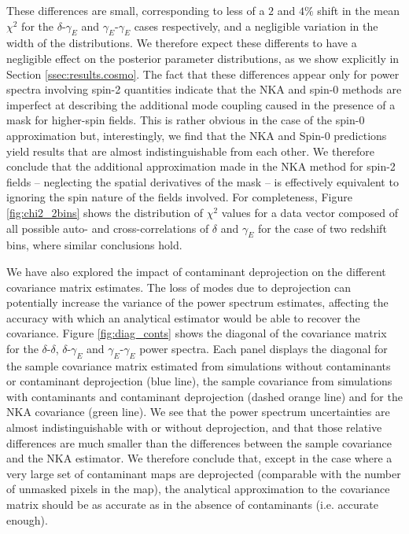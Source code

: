 \documentclass[a4paper,11pt]{article}
\begin{document}
      These differences are small, corresponding to less of a $2$ and $4\%$ shift in the mean $\chi^2$ for the $\delta$-$\gamma_E$ and $\gamma_E$-$\gamma_E$ cases respectively, and a negligible variation in the width of the distributions. We therefore expect these differents to have a negligible effect on the posterior parameter distributions, as we show explicitly in Section \ref{ssec:results.cosmo}. The fact that these differences appear only for power spectra involving spin-2 quantities indicate that the NKA and spin-0 methods are imperfect at describing the additional mode coupling caused in the presence of a mask for higher-spin fields. This is rather obvious in the case of the spin-0 approximation but, interestingly, we find that the NKA and Spin-0 predictions yield results that are almost indistinguishable from each other. We therefore conclude that the additional approximation made in the NKA method for spin-2 fields -- neglecting the spatial derivatives of the mask -- is effectively equivalent to ignoring the spin nature of the fields involved. For completeness, Figure \ref{fig:chi2_2bins} shows the distribution of $\chi^2$ values for a data vector composed of all possible auto- and cross-correlations of $\delta$ and $\gamma_E$ for the case of two redshift bins, where similar conclusions hold.

      We have also explored the impact of contaminant deprojection on the different covariance matrix estimates. The loss of modes due to deprojection can potentially increase the variance of the power spectrum estimates, affecting the accuracy with which an analytical estimator would be able to recover the covariance. Figure \ref{fig:diag_conts} shows the diagonal of the covariance matrix for the $\delta$-$\delta$,      $\delta$-$\gamma_E$ and $\gamma_E$-$\gamma_E$ power spectra. Each panel displays the diagonal for the sample covariance matrix estimated from simulations without contaminants or contaminant deprojection (blue
      line), the sample covariance from simulations with contaminants and contaminant deprojection (dashed orange line) and for the NKA covariance   (green line). We see that the power spectrum uncertainties are almost indistinguishable with or without deprojection, and that those relative differences are much smaller than the differences between the sample covariance and the NKA estimator. We therefore conclude that, except in the case where a very large set of contaminant maps are deprojected (comparable with the number of unmasked pixels in the map), the analytical approximation to the covariance matrix should be as accurate as in the absence of contaminants (i.e. accurate enough).
      
\end{document}
